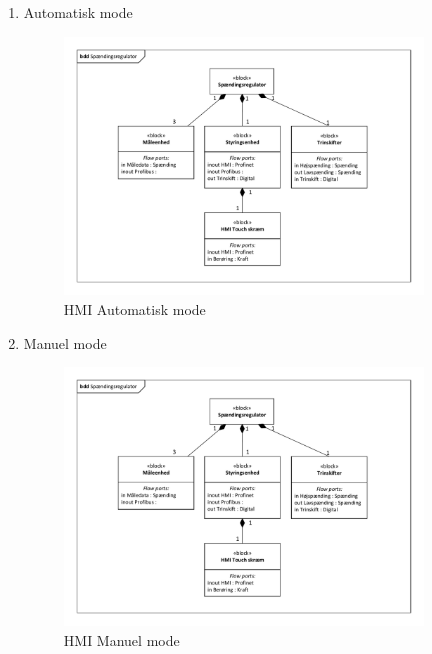 \begin{enumerate}
	\item Automatisk mode
	\begin{figure}[htbp] %
		\centering
		\includegraphics[width=0.9\textwidth]{Figure/BDDSpaendingsregulator}
		\caption{HMI Automatisk mode}
		\label{fig:HMIAutomatikMode}
	\end{figure}

	\item Manuel mode
	\begin{figure}[htbp] %
	\centering
	\includegraphics[width=0.9\textwidth]{Figure/BDDSpaendingsregulator}
	\caption{HMI Manuel mode}
	\label{fig:HMIManuelMode}
	\end{figure}
\end{enumerate}



